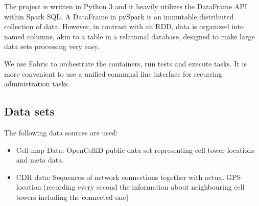 The project is written in Python 3 and it heavily utilizes the DataFrame API within Spark SQL. A DataFrame in pySpark is an immutable distributed collection of data. However, in contrast with an RDD, data is organized into named columns, akin to a table in a relational database, designed to make large data sets processing very easy.

We use Fabric to orchestrate the containers, run tests and execute tasks. It is more convenient to use a unified command line interface for recurring administration tasks. \cite{fabric}

\subsection{Data sets}
The following data sources are used:
\begin{itemize}
\item Cell map Data: OpenCelliD public data set representing cell tower locations and meta data.
\item CDR data: Sequences of network connections together with actual GPS location (recording every second the information about neighbouring cell towers including the connected one)
\end{itemize}


